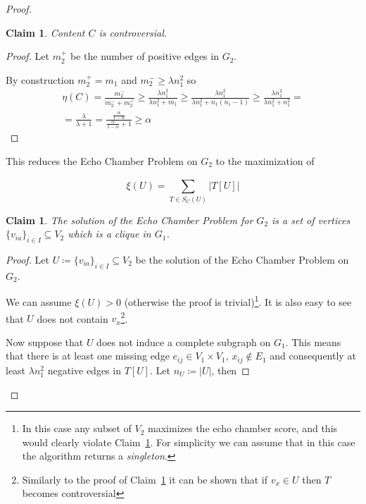 \documentclass{article}
\newtheorem{claim}[theorem]{Claim}
\begin{document}
\begin{proof}
	\begin{claim}
		\label{th:claim-controversial}
		Content $C$ is controversial.
	\end{claim}
	\begin{proof}
		Let $m_{2}^{+} $ be the number of positive edges in $G_{2} $.

		By construction $m_{2}^{+} = m _{1} $ and $m_{2}^{-} \geq
			\lambda n_{1}^{2}  $ so
		\begin{align}
			\eta(C) = \frac{m_{2}^{-} }{m_{2}^{-} +
				m_{2}^{+} } \geq \frac{\lambda n_{1}^{2}}{\lambda n_{1}^{2}
				+ m_{1} } \geq \frac{\lambda n_{1}^{2}}{\lambda n_{1}^{2}
				+ n_{1}(n _{1} -1 )  } \geq \frac{\lambda n_{1}^{2}}{\lambda n_{1}^{2}
			+ n_{1}^{2} } = \\
			= \frac{\lambda }{\lambda + 1} =
			\frac{ \frac{\alpha }{1 - \alpha }  }{ \frac{\alpha }{1 - \alpha }
				+ 1 } \geq \alpha
		\end{align}
	\end{proof}

	This reduces the Echo Chamber Problem on $G_2$ to the maximization of

	\begin{equation}
		\xi(U) = \sum^{}_{T \in S_{C}(U) } | T[U] |
	\end{equation}

	\begin{claim}
		\label{th:claim-complete}
		The solution of the Echo Chamber Problem for $G_2$ is a set of vertices
		$\{ v_{ia} \} _{i \in I}  \subseteq V_{2} $ which is a clique
		in $G_{1} $.
	\end{claim}

	\begin{proof}
		Let $U \coloneqq \{ v_{ia} \} _{i \in I}  \subseteq V_{2} $ be the
		solution of the Echo Chamber Problem on $G_2$.

		We can assume $\xi(U) > 0$ (otherwise the proof is
		trivial)\footnote{In this case any subset of $V_{2} $ maximizes the echo
			chamber score, and this would clearly
			violate Claim~\ref{th:claim-complete}. For simplicity we can
			assume that in this case the algorithm returns a
			\emph{singleton}.}.
		It is also easy to see that $U$ does not contain $v_x$\footnote{Similarly
			to the proof of Claim~\ref{th:claim-controversial} it can be shown
			that if $v_x \in U$ then $T$ becomes controversial}.

		Now suppose that $U$ does not induce a complete subgraph on $G_1$. This
		means that there is at least one missing edge $e_{ij} \in V_1 \times
			V_1 $, $x_{ij} \not\in E_1$ and consequently at
		least $\lambda n^{2}_{1}  $ negative edges in $T[U]$. Let $n_U
			\coloneqq |U|$, then


\end{proof}
\end{proof}
\end{document}

